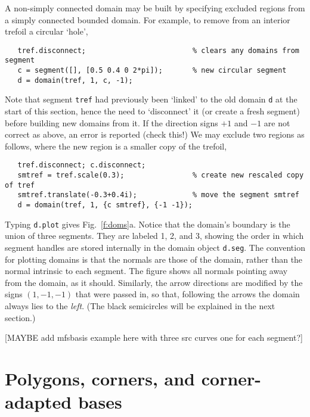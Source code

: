\documentclass[11pt]{article}
\begin{document}
A non-simply connected domain may be built by specifying excluded
regions from a simply connected bounded domain. For example,
to remove from an interior trefoil a circular `hole',
\begin{verbatim}
   tref.disconnect;                         % clears any domains from segment
   c = segment([], [0.5 0.4 0 2*pi]);       % new circular segment
   d = domain(tref, 1, c, -1);
\end{verbatim}
Note that segment {\tt tref} had previously
been `linked' to the old domain {\tt d}
at the start of this section, hence the need to `disconnect' it
(or create a fresh segment) before
building new domains from it. 
If the direction signs $+1$ and $-1$ are not correct as above, an
error is reported (check this!)
We may exclude two regions as follows, where the new region is a smaller copy
of the trefoil,
\begin{verbatim}
   tref.disconnect; c.disconnect;
   smtref = tref.scale(0.3);                % create new rescaled copy of tref
   smtref.translate(-0.3+0.4i);             % move the segment smtref
   d = domain(tref, 1, {c smtref}, {-1 -1});
\end{verbatim}
Typing {\tt d.plot} gives Fig.~\ref{f:doms}a. Notice that
the domain's boundary is the union of three segments. They are labeled
1, 2, and 3, showing the order in which segment handles
are stored internally in the domain object {\tt d.seg}.
The convention for plotting domains is that the normals
are those of the domain, rather than the normal intrinsic to each segment.
The figure shows all normals pointing away from the domain, as it should.
Similarly, the arrow directions are modified by the signs $(1,-1,-1)$ that
were passed in, so that, following the arrows the domain always lies to
the {\em left}. (The black semicircles will be explained in the next section.)


[MAYBE add mfsbasis example here with three src curves one for each segment?]

\vspace{10ex}




\section{Polygons, corners, and corner-adapted bases}
\label{s:poly}
\end{document}
